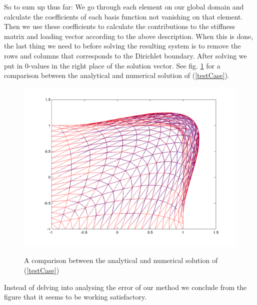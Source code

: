 \documentclass[paper=a4, fontsize=11pt]{scrartcl} %
\begin{document}
So to sum up thus far: We go through each element on our global domain and calculate the coefficients of each basis function not vanishing on that element. Then we use these coefficients to calculate the contributions to the stiffness matrix and loading vector according to the above description. When this is done, the last thing we need to before solving the resulting system is to remove the rows and columns that corresponds to the Dirichlet boundary. After solving we put in $0$-values in the right place of the solution vector. See fig. \ref{fig:TestCase} for a comparison between the analytical and numerical solution of (\ref{testCase}).
\begin{figure}
\centering
\includegraphics[scale=0.5]{Part2oppg2d20.png}
\label{fig:TestCase}
\caption{A comparison between the analytical and numerical solution of (\ref{testCase})}
\end{figure}
Instead of delving into analysing the error of our method we conclude from the figure that it seems to be working satisfactory.
\end{document}
